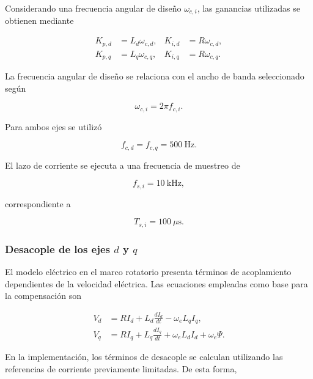 Considerando una frecuencia angular de diseño $\omega_{c,i}$, las
ganancias utilizadas se obtienen mediante

\begin{align}
K_{p,d}
&=
L_d\omega_{c,d},
&
K_{i,d}
&=
R\omega_{c,d},
\\
K_{p,q}
&=
L_q\omega_{c,q},
&
K_{i,q}
&=
R\omega_{c,q}.
\end{align}

La frecuencia angular de diseño se relaciona con el ancho de banda
seleccionado según

\begin{equation}
\omega_{c,i}
=
2\pi f_{c,i}.
\end{equation}

Para ambos ejes se utilizó

\begin{equation}
f_{c,d}=f_{c,q}=500~\mathrm{Hz}.
\end{equation}

El lazo de corriente se ejecuta a una frecuencia de muestreo de

\begin{equation}
f_{s,i}=10~\mathrm{kHz},
\end{equation}

correspondiente a

\begin{equation}
T_{s,i}=100~\mu\mathrm{s}.
\end{equation}


\subsubsection{Desacople de los ejes \texorpdfstring{$d$ y $q$}{d y q}}
\label{subsubsec:desacople_dq}

El modelo eléctrico en el marco rotatorio presenta términos de
acoplamiento dependientes de la velocidad eléctrica. Las ecuaciones
empleadas como base para la compensación son

\begin{align}
V_d
&=
RI_d
+
L_d\frac{dI_d}{dt}
-
\omega_eL_qI_q,
\\
V_q
&=
RI_q
+
L_q\frac{dI_q}{dt}
+
\omega_eL_dI_d
+
\omega_e\Psi.
\end{align}

En la implementación, los términos de desacople se calculan utilizando
las referencias de corriente previamente limitadas. De esta forma,

